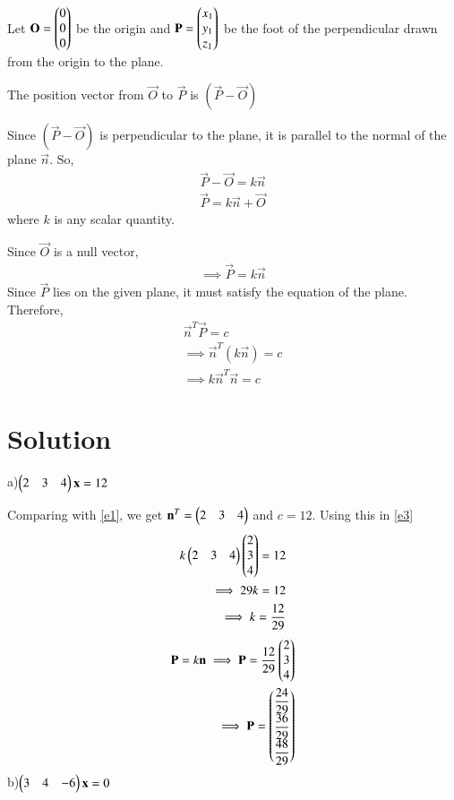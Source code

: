 \documentclass[journal,12pt,twocolumn]{IEEEtran}
\begin{document}
Let $\mathbf{O} = \begin{pmatrix}0\\0\\0\end{pmatrix}$ be the origin and $\mathbf{P} = \begin{pmatrix}x_1\\y_1\\z_1\end{pmatrix}$ be the foot of the perpendicular drawn from the origin to the plane.

The position vector from $\vec{O}$ to $\vec{P}$ is $(\vec{P} - \vec{O})$

Since $(\vec{P} - \vec{O})$ is perpendicular to the plane, it is parallel to the normal of the plane $\vec{n}$. So,
\begin{align}
    \vec{P} - \vec{O} = k\vec{n}\\
    \vec{P} = k\vec{n} + \vec{O}
\end{align}
where $k$ is any scalar quantity.

Since $\vec{O}$ is a null vector,
\begin{align}\label{e2}
    \implies\vec{P} = k\vec{n}
\end{align}
Since $\vec{P}$ lies on the given plane, it must satisfy the equation of the plane. Therefore,
\begin{align}
    \vec{n}^T\vec{P} = c\\
    \implies\vec{n}^T(k\vec{n}) = c\\
    \label{e3}\implies k\vec{n}^T\vec{n} = c
\end{align}
\section{Solution}
a)$\begin{pmatrix}2&3&4\end{pmatrix}\mathbf{x} = 12$

Comparing with \eqref{e1}, we get $\mathbf{n}^T = \begin{pmatrix}2&3&4\end{pmatrix}$ and  $c=12$. Using this in \eqref{e3}
\begin{align}
	k\begin{pmatrix}2&3&4\end{pmatrix}\begin{pmatrix}2\\3\\4\end{pmatrix} = 12\\
	\implies 29k = 12\\
	\implies k = \frac{12}{29}
\end{align}
\begin{align}
	\mathbf{P} = k\mathbf{n}
	\implies\mathbf{P} = \frac{12}{29}\begin{pmatrix}2\\3\\4\end{pmatrix}\\
	\implies\mathbf{P}= \begin{pmatrix}\dfrac{24}{29}\\\dfrac{36}{29}\\\dfrac{48}{29}\end{pmatrix}
\end{align}
b)$\begin{pmatrix}3&4&-6\end{pmatrix}\mathbf{x} = 0$
\end{document}
